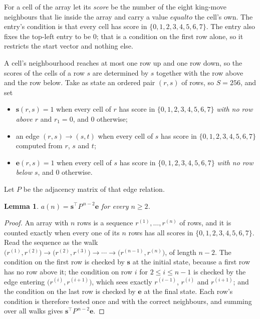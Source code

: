 \documentclass[11pt,a4paper]{article}
\theoremstyle{plain}
\newtheorem{lemma}[theorem]{Lemma}
\theoremstyle{definition}
\begin{document}
For a cell of the array let its \emph{score} be the number of the eight king-move neighbours that lie inside
the array and carry a value $equal to$ the cell's own. The entry's condition is that every cell
has score in $\{0,1,2,3,4,5,6,7\}$. The entry also fixes the top-left entry to be $0$; that is a condition on the first row alone, so it restricts the start vector and nothing else.

A cell's neighbourhood reaches at most one row up and one row down, so the scores of the
cells of a row $s$ are determined by $s$ together with the row above and the row below.
Take as state an ordered pair $(r,s)$ of rows, so $S=256$, and set
\begin{itemize}
\item $\mathbf{s}(r,s)=1$ when every cell of $r$ has score in $\{0,1,2,3,4,5,6,7\}$ \emph{with no row
above $r$} and $r_1=0$, and $0$ otherwise;
\item an edge $(r,s)\to(s,t)$ when every cell of $s$ has score in $\{0,1,2,3,4,5,6,7\}$ computed from
$r$, $s$ and $t$;
\item $\mathbf{e}(r,s)=1$ when every cell of $s$ has score in $\{0,1,2,3,4,5,6,7\}$ \emph{with no row
below $s$}, and $0$ otherwise.
\end{itemize}
Let $P$ be the adjacency matrix of that edge relation.

\begin{lemma}\label{lem:walk}
$a(n)=\mathbf{s}^{\!\top}P^{\,n-2}\mathbf{e}$ for every $n\ge2$.
\end{lemma}

\begin{proof}
An array with $n$ rows is a sequence $r^{(1)},\dots,r^{(n)}$ of rows, and it is counted
exactly when every one of its $n$ rows has all scores in $\{0,1,2,3,4,5,6,7\}$. Read the sequence as the
walk $\bigl(r^{(1)},r^{(2)}\bigr)\to\bigl(r^{(2)},r^{(3)}\bigr)\to\cdots\to
\bigl(r^{(n-1)},r^{(n)}\bigr)$, of length $n-2$. The condition on the first row is
checked by $\mathbf{s}$ at the initial state, because a first row has no row above it; the
condition on row $i$ for $2\le i\le n-1$ is checked by the edge entering
$\bigl(r^{(i)},r^{(i+1)}\bigr)$, which sees exactly $r^{(i-1)}$, $r^{(i)}$ and
$r^{(i+1)}$; and the condition on the last row is checked by $\mathbf{e}$ at the final
state. Each row's condition is therefore tested once and with the correct neighbours, and
summing over all walks gives $\mathbf{s}^{\!\top}P^{\,n-2}\mathbf{e}$.
\end{proof}
\end{document}
